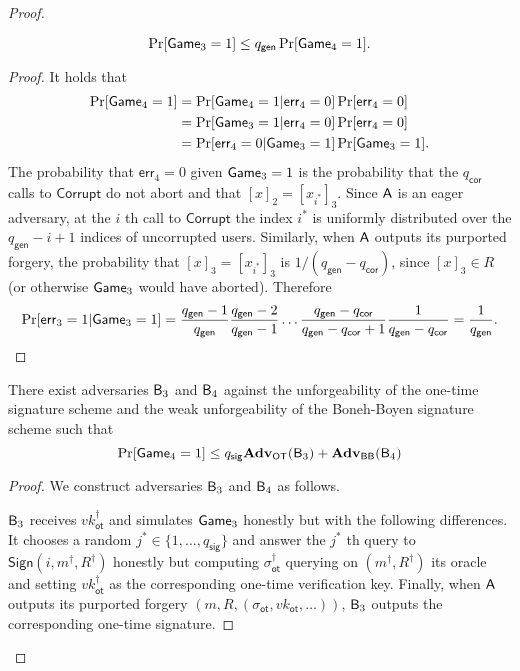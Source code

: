 \begin{proof}
\begin{lemma}
$$
\Pr[\mathsf{Game}_3=1]\leq q_\mathsf{gen}\Pr[\mathsf{Game}_4=1].
$$
\end{lemma}
\begin{proof}
It holds that
\begin{align*}
\Pr[\mathsf{Game}_4=1] &= \Pr[\mathsf{Game}_4=1|\mathsf{err}_4=0]\Pr[\mathsf{err}_4=0]\\
&=\Pr[\mathsf{Game}_3=1|\mathsf{err}_4=0]\Pr[\mathsf{err}_4=0]\\
&=\Pr[\mathsf{err}_4=0|\mathsf{Game}_3=1]\Pr[\mathsf{Game}_3=1].
\end{align*}
The probability that $\mathsf{err}_4=0$ given $\mathsf{Game}_3=1$ is the probability that the ${q_\mathsf{cor}}$ calls to $\mathsf{Corrupt}$ do not abort and that $[x]_2=[x_{i^*}]_3$. Since $\mathsf{A}$ is an eager adversary, at the $i$ th call to $\mathsf{Corrupt}$ the index $i^*$ is uniformly distributed over the ${q_\mathsf{gen}}-i+1$ indices of uncorrupted users. Similarly, when $\mathsf{A}$ outputs its purported forgery, the probability that $[x]_3=[x_{i^*}]_3$ is $1/({q_\mathsf{gen}}-{q_\mathsf{cor}})$, since $[x]_3\in R$ (or otherwise $\mathsf{Game}_3$ would have aborted). Therefore
$$
\Pr[\mathsf{err}_3=1|\mathsf{Game}_3=1]=\frac{{q_\mathsf{gen}}-1}{{q_\mathsf{gen}}}\frac{{q_\mathsf{gen}}-2}{{q_\mathsf{gen}}-1}\ldots\frac{{q_\mathsf{gen}}-{q_\mathsf{cor}}}{{q_\mathsf{gen}}-{q_\mathsf{cor}}+1}\frac{1}{{q_\mathsf{gen}}-{q_\mathsf{cor}}}=\frac{1}{{q_\mathsf{gen}}}.
$$ 
\end{proof}

\begin{lemma}  There exist adversaries $\mathsf{B}_3$ and $\mathsf{B}_4$ against the unforgeability of the one-time signature scheme and the weak unforgeability of the Boneh-Boyen signature scheme such that
$$
\Pr[\mathsf{Game}_4=1]\leq q_\mathsf{sig}\mathbf{Adv}_{\mathsf{OT}}(\mathsf{B}_3)+\mathbf{Adv}_{\mathsf{BB}}(\mathsf{B}_4)
$$
\end{lemma}
\begin{proof}
We construct adversaries $\mathsf{B}_3$ and $\mathsf{B}_4$ as follows.

$\mathsf{B}_3$ receives $vk_\mathsf{ot}^\dag$ and simulates $\mathsf{Game}_3$ honestly but with the following differences. It chooses a random $j^*\in\{1,\ldots, q_\mathsf{sig}\}$ and answer the $j^*$ th query to $\mathsf{Sign}(i,m^\dag,R^\dag)$ honestly but computing $\sigma_\mathsf{ot}^\dag$ querying on $(m^\dag,R^\dag)$ its oracle and setting $vk_\mathsf{ot}^\dag$ as the corresponding one-time verification key. Finally, when $\mathsf{A}$ outputs its purported forgery $(m,R,(\sigma_\mathsf{ot},vk_\mathsf{ot},\ldots))$, $\mathsf{B}_3$ outputs the corresponding one-time signature.


\end{proof}
\end{proof}
